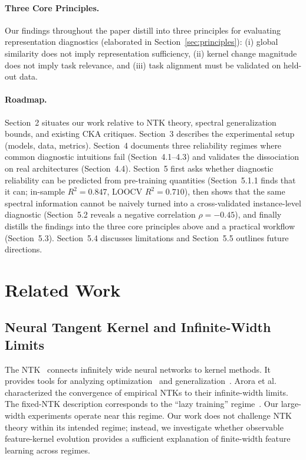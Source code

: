\documentclass[twoside,11pt]{article}
\begin{document}
\paragraph{Three Core Principles.}
Our findings throughout the paper distill into three principles for evaluating representation diagnostics (elaborated in Section~\ref{sec:principles}): (i) global similarity does not imply representation sufficiency, (ii) kernel change magnitude does not imply task relevance, and (iii) task alignment must be validated on held-out data.

\paragraph{Roadmap.}
Section~2 situates our work relative to NTK theory, spectral generalization bounds, and existing CKA critiques. Section~3 describes the experimental setup (models, data, metrics). Section~4 documents three reliability regimes where common diagnostic intuitions fail (Section~4.1--4.3) and validates the dissociation on real architectures (Section~4.4). Section~5 first asks whether diagnostic reliability can be predicted from pre-training quantities (Section~5.1.1 finds that it can; in-sample $R^2=0.847$, LOOCV $R^2=0.710$), then shows that the same spectral information cannot be naively turned into a cross-validated instance-level diagnostic (Section~5.2 reveals a negative correlation $\rho=-0.45$), and finally distills the findings into the three core principles above and a practical workflow (Section~5.3). Section~5.4 discusses limitations and Section~5.5 outlines future directions.

\section{Related Work}
\label{sec:related}

\subsection{Neural Tangent Kernel and Infinite-Width Limits}
The NTK~\citep{jacot2018neural} connects infinitely wide neural networks to kernel methods. It provides tools for analyzing optimization~\citep{du2019neural,allen2019learning} and generalization~\citep{arora2019exact}.  Arora et al.~\cite{arora2019exact} characterized the convergence of empirical NTKs to their infinite-width limits.  The fixed-NTK description corresponds to the ``lazy training'' regime~\citep{chizat2020lazy}.  Our large-width experiments operate near this regime.  Our work does not challenge NTK theory within its intended regime; instead, we investigate whether observable feature-kernel evolution provides a sufficient explanation of finite-width feature learning across regimes.
\end{document}
